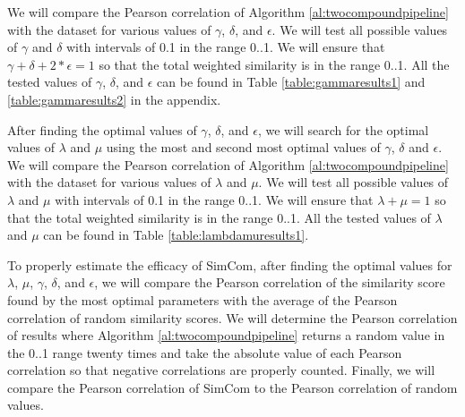 \documentclass{article}
\begin{document}
We will compare the Pearson correlation of Algorithm \ref{al:twocompoundpipeline} with the dataset for various values of $\gamma$, $\delta$, and $\epsilon$. We will test all possible values of $\gamma$ and $\delta$ with intervals of 0.1 in the range 0..1. We will ensure that $\gamma + \delta + 2 * \epsilon = 1$ so that the total weighted similarity is in the range 0..1. All the tested values of $\gamma$, $\delta$, and $\epsilon$ can be found in Table \ref{table:gammaresults1} and \ref{table:gammaresults2} in the appendix. 

After finding the optimal values of $\gamma$, $\delta$, and $\epsilon$, we will search for the optimal values of $\lambda$ and $\mu$ using the most and second most optimal values of $\gamma$, $\delta$ and $\epsilon$. We will compare the Pearson correlation of Algorithm \ref{al:twocompoundpipeline} with the dataset for various values of $\lambda$ and $\mu$. We will test all possible values of $\lambda$ and $\mu$ with intervals of 0.1 in the range 0..1. We will ensure that $\lambda + \mu = 1$ so that the total weighted similarity is in the range 0..1. All the tested values of $\lambda$ and $\mu$ can be found in Table \ref{table:lambdamuresults1}.

To properly estimate the efficacy of SimCom, after finding the optimal values for $\lambda$, $\mu$, $\gamma$, $\delta$, and $\epsilon$, we will compare the Pearson correlation of the similarity score found by the most optimal parameters with the average of the Pearson correlation of random similarity scores. We will determine the Pearson correlation of results where Algorithm \ref{al:twocompoundpipeline} returns a random value in the 0..1 range twenty times and take the absolute value of each Pearson correlation so that negative correlations are properly counted. Finally, we will compare the Pearson correlation of SimCom to the Pearson correlation of random values.



\end{document}

